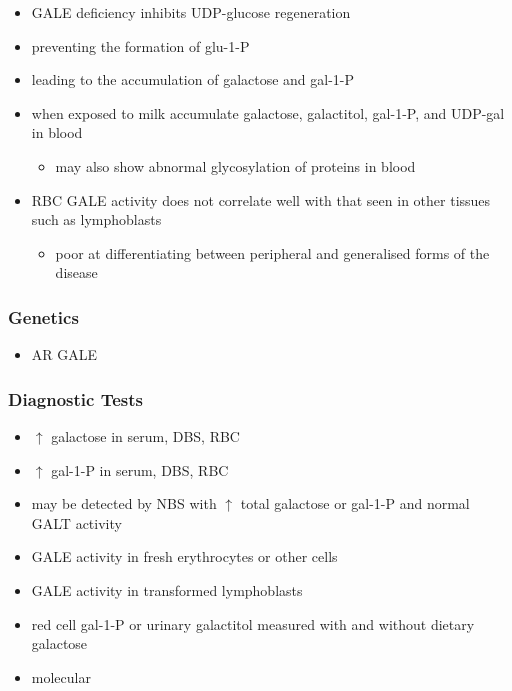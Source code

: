 \documentclass[12pt]{scrartcl}
\begin{document}

\begin{itemize}
\item GALE deficiency inhibits UDP-glucose regeneration
\item preventing the formation of glu-1-P
\item leading to the accumulation of galactose and gal-1-P
\end{itemize}
\begin{itemize}
\item when exposed to milk accumulate galactose, galactitol, gal-1-P, and
UDP-gal in blood
\begin{itemize}
\item may also show abnormal glycosylation of proteins in blood
\end{itemize}
\item RBC GALE activity does not correlate well with that seen in
other tissues such as lymphoblasts
\begin{itemize}
\item poor at differentiating between peripheral and generalised forms
of the disease
\end{itemize}
\end{itemize}

\subsubsection{Genetics}
\label{sec:orga882186}
\begin{itemize}
\item AR GALE
\end{itemize}

\subsubsection{Diagnostic Tests}
\label{sec:org7b027c1}
\begin{itemize}
\item \(\uparrow\) galactose in serum, DBS, RBC
\item \(\uparrow\) gal-1-P in serum, DBS, RBC
\item may be detected by NBS with \(\uparrow\) total galactose or gal-1-P and normal GALT activity
\item GALE activity in fresh erythrocytes or other cells
\item GALE activity in transformed lymphoblasts
\item red cell gal-1-P or urinary galactitol measured with and without dietary galactose
\item molecular
\end{itemize}
\end{document}
